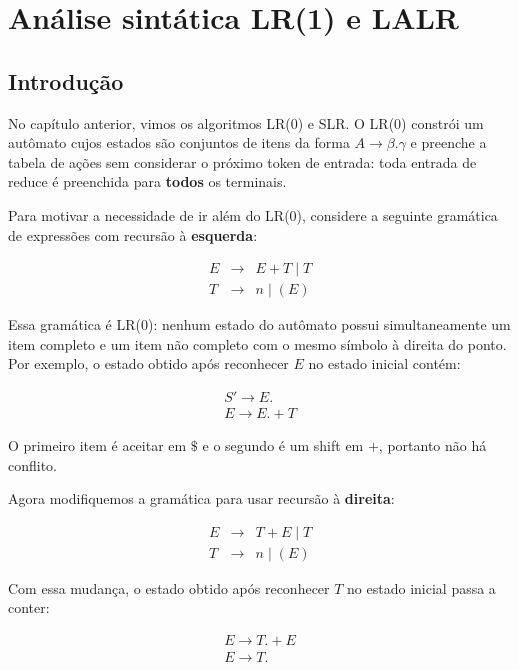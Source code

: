 \chapter{Análise sintática LR(1) e LALR}

\section{Introdução}\label{introduuxe7uxe3o}

No capítulo anterior, vimos os algoritmos LR(0) e SLR. O LR(0)
constrói um autômato cujos estados são conjuntos de itens da forma
\(A \to \beta . \gamma\) e preenche a tabela de ações sem considerar
o próximo token de entrada: toda entrada de reduce é preenchida para
\textbf{todos} os terminais.

Para motivar a necessidade de ir além do LR(0), considere a seguinte
gramática de expressões com recursão à \textbf{esquerda}:

\[
  \begin{array}{lcl}
    E & \to & E + T \mid T \\
    T & \to & n \mid ( E )
  \end{array}
\]

Essa gramática é LR(0): nenhum estado do autômato possui
simultaneamente um item completo e um item não completo com o mesmo
símbolo à direita do ponto. Por exemplo, o estado obtido após
reconhecer \(E\) no estado inicial contém:

\[
  \begin{array}{l}
    S' \to E . \\
    E \to E . + T
  \end{array}
\]

O primeiro item é aceitar em \(\$\) e o segundo é um shift em \(+\),
portanto não há conflito.

Agora modifiquemos a gramática para usar recursão à \textbf{direita}:

\[
  \begin{array}{lcl}
    E & \to & T + E \mid T \\
    T & \to & n \mid ( E )
  \end{array}
\]

Com essa mudança, o estado obtido após reconhecer \(T\) no estado
inicial passa a conter:

\[
  \begin{array}{l}
    E \to T . + E \\
    E \to T .
  \end{array}
\]

